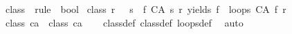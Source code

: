 \begin{isabellebody}
\isanewline
{}\isamarkupfalse%
\ class{}\ {\isacharcolon}{\isacharcolon}\ {\isachardoublequoteopen}rule\ {\isasymRightarrow}\ bool{\isachardoublequoteclose}\ \isanewline
{\isachardoublequoteopen}class{}\ r\ {\isasymequiv}\ {\isacharparenleft}{\isasymforall}\ s{\isachardot}\ {\isacharparenleft}{\isasymexists}\ f{\isachardot}\ {\isacharparenleft}CA\ s\ r{\isacharparenright}\ yields\ f\ {\isasymand}\ loops\ {\isacharparenleft}CA\ f\ r{\isacharparenright}{\isacharparenright}{\isacharparenright}{\isachardoublequoteclose}\isanewline
\isanewline
{}\isamarkupfalse%
\ {\isachardoublequoteopen}class{}\ ca\ {\isasymLongrightarrow}\ class{}\ ca{\isachardoublequoteclose}\isanewline
%
\isadelimproof
\ \ %
\endisadelimproof
%
\isatagproof
{}\isamarkupfalse%
\ class{}{\isacharunderscore}def\ class{}{\isacharunderscore}def\ loops{\isacharunderscore}def\ \isamarkupfalse%
\ auto%
\endisatagproof
{\isafoldproof}%
%
\isadelimproof
\isanewline
%
\endisadelimproof
%
\isadelimtheory
%
\endisadelimtheory
%
\isatagtheory
{}\isamarkupfalse%
%
\endisatagtheory
{\isafoldtheory}%
%
\isadelimtheory
%
\endisadelimtheory
%
\end{isabellebody}%
\endinput
